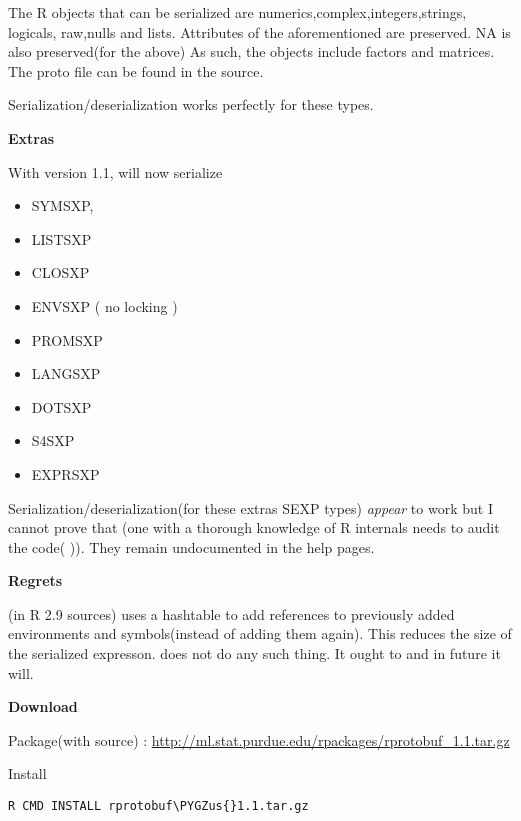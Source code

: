 \documentclass[letterpaper,10pt,english]{manual}
\def\PYGZus{\char`\_}
\begin{document}
The R objects that can be serialized are numerics,complex,integers,strings, logicals,
raw,nulls and lists.  Attributes of the aforementioned are preserved. NA is also
preserved(for the above) As such, the objects include factors and matrices.  The proto file can be
found in the source.

Serialization/deserialization works perfectly for these types.

\textbf{Extras}

With version 1.1,  will now serialize
\begin{itemize}
\item {} 
SYMSXP,

\item {} 
LISTSXP

\item {} 
CLOSXP

\item {} 
ENVSXP ( no locking )

\item {} 
PROMSXP

\item {} 
LANGSXP

\item {} 
DOTSXP

\item {} 
S4SXP

\item {} 
EXPRSXP

\end{itemize}

Serialization/deserialization(for these extras SEXP types)  \emph{appear} to work but I cannot prove that (one with a thorough knowledge of R internals needs to audit the code(  )). They remain undocumented in the help pages.

\textbf{Regrets}

 (in R 2.9 sources) uses a hashtable to add references to previously added environments and symbols(instead of adding them again). This reduces the size of the serialized expresson.  does not do any such thing. It ought to and in future it will.

\textbf{Download}

Package(with source) : \href{http://ml.stat.purdue.edu/rpackages/rprotobuf\_1.1.tar.gz}{http://ml.stat.purdue.edu/rpackages/rprotobuf\_1.1.tar.gz}

Install

\begin{Verbatim}[commandchars=\\\{\}]
R CMD INSTALL rprotobuf\PYGZus{}1.1.tar.gz
\end{Verbatim}
\end{document}

